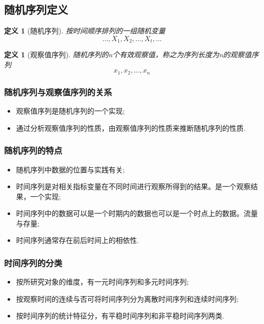 \documentclass[12pt, a4paper, oneside]{ctexbook}
\newtheorem{definition}[theorem]{定义}
\begin{document}
\subsection{随机序列定义}
\begin{definition}[随机序列]
    按时间顺序排列的一组随机变量
    \begin{equation*}
        \ldots,X_1,X_2,\ldots,X_{t},\ldots
    \end{equation*}
\end{definition}

\begin{definition}[观察值序列]
    随机序列的n个有效观察值，称之为序列长度为n的观察值序列
    \begin{equation*}
        x_1,x_2,\ldots,x_{n}
    \end{equation*}
\end{definition}

\subsubsection{随机序列与观察值序列的关系}
\begin{itemize}
    \item 观察值序列是随机序列的一个实现;
    \item 通过分析观察值序列的性质，由观察值序列的性质来推断随机序列的性质.
\end{itemize}

\subsubsection*{随机序列的特点}
\begin{itemize}
    \item 随机序列中数据的位置与实践有关;
    \item 时间序列是对相关指标变量在不同时间进行观察所得到的结果。是一个观察结果，一个实现;
    \item 时间序列中的数据可以是一个时期内的数据也可以是一个时点上的数据。流量与存量;
    \item 时间序列通常存在前后时间上的相依性.
\end{itemize}

\subsubsection*{时间序列的分类}
\begin{itemize}
    \item 按所研究对象的维度，有一元时间序列和多元时间序列;
    \item 按观察时间的连续与否可将时间序列分为离散时间序列和连续时间序列;
    \item 按时间序列的统计特征分，有平稳时间序列和非平稳时间序列两类.
\end{itemize}
\end{document}
